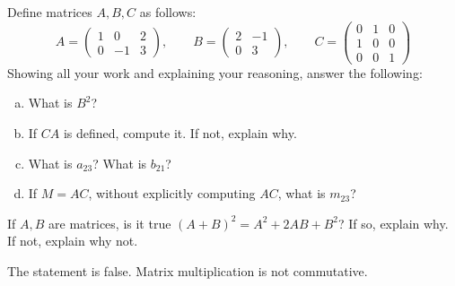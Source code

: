 \documentclass[11pt,letterpaper]{article}
\begin{document}
 Define matrices $A, B, C$ as follows:
	\[
	A= \begin{pmatrix} 1 & 0 & 2 \\ 0 & -1 & 3 \end{pmatrix}, \qquad B= \begin{pmatrix} 2 & -1 \\ 0 & 3 \end{pmatrix}, \qquad C= \begin{pmatrix} 0 & 1 & 0 \\ 1 & 0 & 0 \\ 0 & 0 & 1 \end{pmatrix}
	\]
Showing all your work and explaining your reasoning, answer the following:
        \begin{enumerate}[(a)]
        \item What is $B^2$?
        \item If $CA$ is defined, compute it. If not, explain why. 
        \item What is $a_{23}$? What is $b_{21}$?
        \item If $M= AC$, without explicitly computing $AC$, what is $m_{23}$?
        \end{enumerate}



\newpage



 If $A, B$ are matrices, is it true $(A + B)^2= A^2 + 2AB + B^2$? If so, explain why. If not, explain why not. \pspace

\sol The statement is false. Matrix multiplication is not commutative. 
\end{document}
